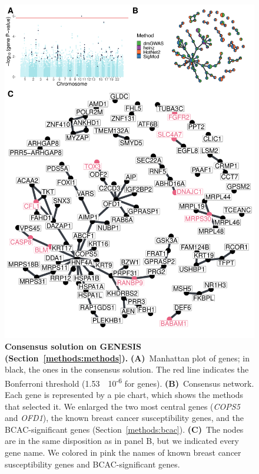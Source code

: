\documentclass[10pt,letterpaper]{article}
\begin{document}
\begin{figure}[!ht]
  \centering
  \includegraphics[width=.9\linewidth]{./figures/figure_2.pdf}
  \caption{ \textbf{Consensus solution on GENESIS (Section~\ref{methods:methods}).} \textbf{(A)}~Manhattan plot of genes; in black, the ones in the consensus solution. The red line indicates the Bonferroni threshold (1.53~\texttimes{}~10\textsuperscript{-6} for genes). \textbf{(B)}~Consensus network. Each gene is represented by a pie chart, which shows the methods that selected it. We enlarged the two most central genes (\emph{COPS5} and \emph{OFD1}), the known breast cancer susceptibility genes, and the BCAC-significant genes (Section~\ref{methods:bcac}). \textbf{(C)}~The nodes are in the same disposition as in panel B, but we indicated every gene name. We colored in pink the names of known breast cancer susceptibility genes and BCAC-significant genes.}
  \label{fig:consensus}
\end{figure}
\end{document}
